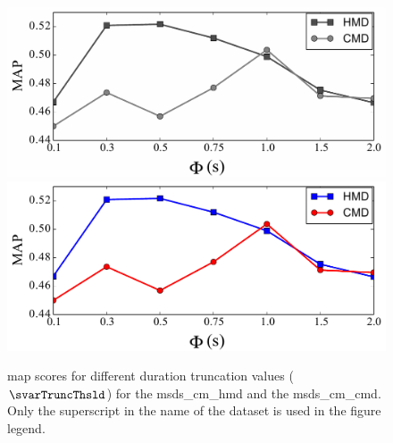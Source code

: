 \begin{figure}[h]
	\begin{center}
		\ifdefined\PRINTVER
			\includegraphics[width=\figSizeEightyFive]{ch06_patterns/figures/ImprovingSimilarity/MAP_per_Duration_Truncation_BW.pdf}
		\else
			\includegraphics[width=\figSizeEightyFive]{ch06_patterns/figures/ImprovingSimilarity/MAP_per_Duration_Truncation.pdf}
		\fi
	\end{center}
	\caption[\acrshort{map} scores for different duration truncation values]{\gls{map} scores for different duration truncation values ($\svarTruncThsld$) for the \acrshort{msds_cm_hmd} and the \acrshort{msds_cm_cmd}. Only the superscript in the name of the dataset is used in the figure legend.} 
	\label{fig:map_per_duration_truncation}
\end{figure}

